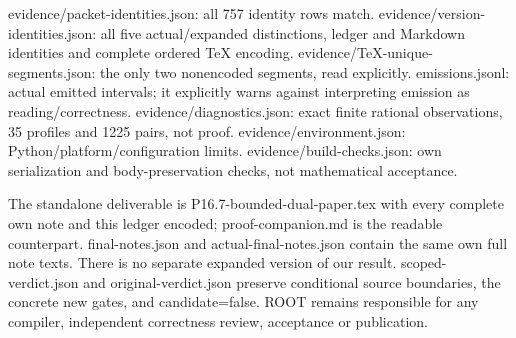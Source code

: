 \documentclass[11pt]{article}
\begin{document}
evidence/packet-identities.json: all 757 identity rows match. evidence/version-identities.json: all five actual/expanded distinctions, ledger and Markdown identities and complete ordered TeX encoding. evidence/TeX-unique-segments.json: the only two nonencoded segments, read explicitly. emissions.jsonl: actual emitted intervals; it explicitly warns against interpreting emission as reading/correctness. evidence/diagnostics.json: exact finite rational observations, 35 profiles and 1225 pairs, not proof. evidence/environment.json: Python/platform/configuration limits. evidence/build-checks.json: own serialization and body-preservation checks, not mathematical acceptance.

The standalone deliverable is P16.7-bounded-dual-paper.tex with every complete own note and this ledger encoded; proof-companion.md is the readable counterpart. final-notes.json and actual-final-notes.json contain the same own full note texts. There is no separate expanded version of our result. scoped-verdict.json and original-verdict.json preserve conditional source boundaries, the concrete new gates, and candidate=false. ROOT remains responsible for any compiler, independent correctness review, acceptance or publication.
\end{document}
